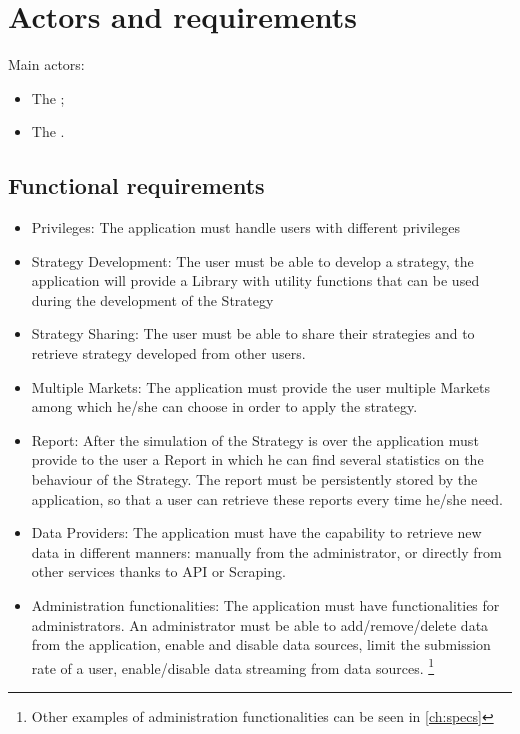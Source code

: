 \chapter{Actors and requirements}\label{ch:requirements}

Main actors:
\begin{itemize}
	\item The ;
	\item The .
\end{itemize}

\section{Functional requirements}\label{sec:functionalrequirements}

\begin{itemize}
	\item Privileges: The application must handle users with different privileges
	\item Strategy Development: The user must be able to develop a strategy, the application will provide a Library with utility functions that can be used during the development of the Strategy
	\item Strategy Sharing: The user must be able to share their strategies and to retrieve strategy developed from other users.
	\item Multiple Markets: The application must provide the user multiple Markets among which he/she can choose in order to apply the strategy.
	\item Report: After the simulation of the Strategy is over the application must provide to the user a Report in which he can find several statistics on the behaviour of the Strategy. The report must be persistently stored by the application, so that a user can retrieve these reports every time he/she need.
	\item Data Providers: The application must have the capability to retrieve new data in different manners: manually from the administrator, or directly from other services thanks to API or Scraping.
	\item Administration functionalities: The application must have functionalities for administrators. An administrator must be able to add/remove/delete data from the application, enable and disable data sources, limit the submission rate of a user, enable/disable data streaming from data sources. \footnote{Other examples of administration functionalities can be seen in \ref{ch:specs}}
\end{itemize}

